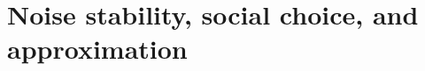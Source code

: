 \chapter{Noise stability, social choice, and approximation}
\label{chapter:gaussian-applications}







